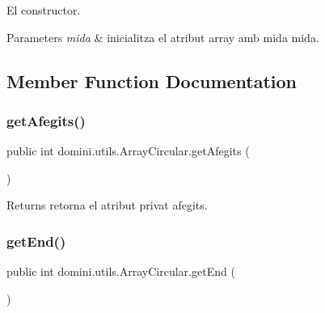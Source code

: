 El constructor. 


\begin{DoxyParams}{Parameters}
{\em mida} & inicialitza el atribut array amb mida mida. \\
\hline
\end{DoxyParams}


\subsection{Member Function Documentation}
\mbox{\label{classdomini_1_1utils_1_1ArrayCircular_a1c65dd3b452fa82ab8827885a7a2fbe1}} 
\subsubsection{\texorpdfstring{get\+Afegits()}{getAfegits()}}
{\footnotesize\ttfamily public int domini.\+utils.\+Array\+Circular.\+get\+Afegits (\begin{DoxyParamCaption}{ }\end{DoxyParamCaption})\hspace{0.3cm}{\ttfamily [inline]}}

\begin{DoxyReturn}{Returns}
retorna el atribut privat afegits. 
\end{DoxyReturn}
\mbox{\label{classdomini_1_1utils_1_1ArrayCircular_a3fe38ed7aa9d3b4f99bc4c80cd72bb3e}} 
\subsubsection{\texorpdfstring{get\+End()}{getEnd()}}
{\footnotesize\ttfamily public int domini.\+utils.\+Array\+Circular.\+get\+End (\begin{DoxyParamCaption}{ }\end{DoxyParamCaption})\hspace{0.3cm}{\ttfamily [inline]}}



